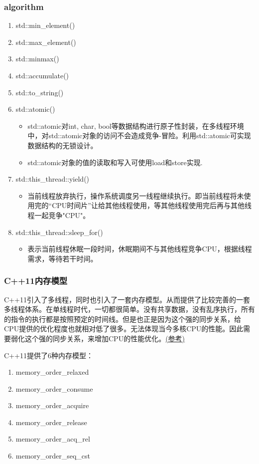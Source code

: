 \begin{frame}
\frametitle{algorithm}
\begin{enumerate}
	\item std::min\_element()
	\item std::max\_element()
	\item std::minmax()
	\item std::accumulate()
	\item std::to\_string()
	\item std::atomic()
	\begin{itemize}
		\item std::atomic对int, char, bool等数据结构进行原子性封装，在多线程环境中，对std::atomic对象的访问不会造成竞争-冒险。利用std::atomic可实现数据结构的无锁设计。
		\item std::atomic对象的值的读取和写入可使用load和store实现.
	\end{itemize}
	\item std::this\_thread::yield()
	\begin{itemize}
		\item 当前线程放弃执行，操作系统调度另一线程继续执行。即当前线程将未使用完的“CPU时间片”让给其他线程使用，等其他线程使用完后再与其他线程一起竞争"CPU"。
	\end{itemize}
	\item std::this\_thread::sleep\_for()
	\begin{itemize}
		\item 表示当前线程休眠一段时间，休眠期间不与其他线程竞争CPU，根据线程需求，等待若干时间。
	\end{itemize}
\end{enumerate}
\end{frame}

\begin{frame}
\frametitle{C++11内存模型}
C++11引入了多线程，同时也引入了一套内存模型。从而提供了比较完善的一套多线程体系。在单线程时代，一切都很简单。没有共享数据，没有乱序执行，所有的指令的执行都是按照预定的时间线。但是也正是因为这个强的同步关系，给CPU提供的优化程度也就相对低了很多。无法体现当今多核CPU的性能。因此需要弱化这个强的同步关系，来增加CPU的性能优化。\href{https://www.cnblogs.com/navono007/p/5746048.html}{(参考)}

C++11提供了6种内存模型：
\begin{enumerate}
	\item memory\_order\_relaxed
	\item memory\_order\_consume
	\item memory\_order\_acquire
	\item memory\_order\_release
	\item memory\_order\_acq\_rel
	\item memory\_order\_seq\_cst
\end{enumerate}
\end{frame}

